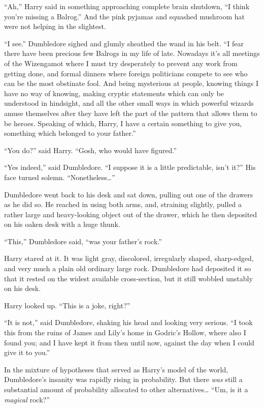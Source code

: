``Ah,'' Harry said in something approaching complete brain shutdown, ``I
think you're missing a Balrog.'' And the pink pyjamas and squashed
mushroom hat were not helping in the slightest.

``I see.'' Dumbledore sighed and glumly sheathed the wand in his belt.
``I fear there have been precious few Balrogs in my life of late.
Nowadays it's all meetings of the Wizengamot where I must try
desperately to prevent any work from getting done, and formal dinners
where foreign politicians compete to see who can be the most obstinate
fool. And being mysterious at people, knowing things I have no way of
knowing, making cryptic statements which can only be understood in
hindsight, and all the other small ways in which powerful wizards amuse
themselves after they have left the part of the pattern that allows them
to be heroes. Speaking of which, Harry, I have a certain something to
give you, something which belonged to your father.''

``You do?'' said Harry. ``Gosh, who would have figured.''

``Yes indeed,'' said Dumbledore. ``I suppose it is a little predictable,
isn't it?'' His face turned solemn. ``Nonetheless\ldots{}''

Dumbledore went back to his desk and sat down, pulling out one of the
drawers as he did so. He reached in using both arms, and, straining
slightly, pulled a rather large and heavy-looking object out of the
drawer, which he then deposited on his oaken desk with a huge thunk.

``This,'' Dumbledore said, ``was your father's rock.''

Harry stared at it. It was light gray, discolored, irregularly shaped,
sharp-edged, and very much a plain old ordinary large rock. Dumbledore
had deposited it so that it rested on the widest available
cross-section, but it still wobbled unstably on his desk.

Harry looked up. ``This is a joke, right?''

``It is not,'' said Dumbledore, shaking his head and looking very
serious. ``I took this from the ruins of James and Lily's home in
Godric's Hollow, where also I found you; and I have kept it from then
until now, against the day when I could give it to you.''

In the mixture of hypotheses that served as Harry's model of the world,
Dumbledore's insanity was rapidly rising in probability. But there
\emph{was} still a substantial amount of probability allocated to other
alternatives\ldots{} ``Um, is it a \emph{magical} rock?''

